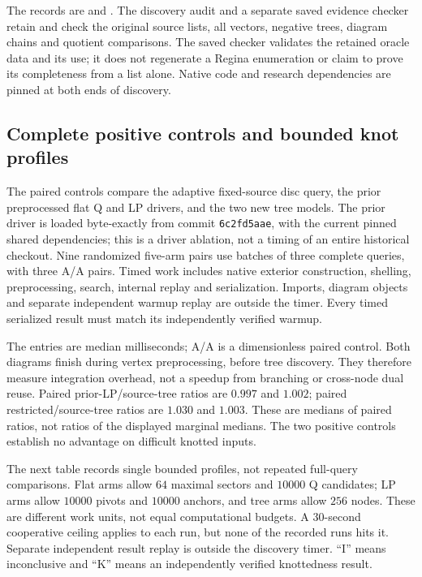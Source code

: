 The records are  and
.  The discovery audit and a separate saved
evidence checker retain and check the original source lists, all vectors,
negative trees, diagram chains and quotient comparisons.  The saved checker
validates the retained oracle data and its use; it does not regenerate a
Regina enumeration or claim to prove its completeness from a list alone.
Native code and research dependencies are pinned at both ends of discovery.

\subsection{Complete positive controls and bounded knot profiles}

The paired controls compare the adaptive fixed-source disc query, the prior
preprocessed flat Q and LP drivers, and the two new tree models.  The prior
driver is loaded byte-exactly from commit \texttt{6c2fd5aae}, with the
current pinned shared dependencies; this is a driver ablation, not a timing
of an entire historical checkout.  Nine randomized five-arm pairs use
batches of three complete queries, with three A/A pairs.  Timed work includes
native exterior construction, shelling, preprocessing, search, internal
replay and serialization.  Imports, diagram objects and separate independent
warmup replay are outside the timer.  Every timed serialized result must
match its independently verified warmup.

\begin{center}
\small
\setlength{\tabcolsep}{3pt}

\end{center}

The entries are median milliseconds; A/A is a dimensionless paired control.
Both diagrams finish during vertex preprocessing, before tree discovery.
They therefore measure integration overhead, not a speedup from branching
or cross-node dual reuse.  Paired prior-LP/source-tree ratios are $0.997$
and $1.002$; paired restricted/source-tree ratios are $1.030$ and $1.003$.
These are medians of paired ratios, not ratios of the displayed marginal
medians.  The two positive controls establish no advantage on difficult
knotted inputs.

The next table records single bounded profiles, not repeated full-query
comparisons.  Flat arms allow $64$ maximal sectors and $10000$ Q candidates;
LP arms allow $10000$ pivots and $10000$ anchors, and tree arms allow $256$
nodes.  These are different work units, not equal computational budgets.
A $30$-second cooperative ceiling applies to each run, but none of the
recorded runs hits it.  Separate independent result replay is outside the
discovery timer.  ``I'' means inconclusive and ``K'' means an independently
verified knottedness result.

